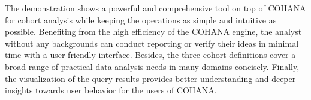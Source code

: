 \documentclass[10pt,conference,letterpaper]{IEEEtran}
\begin{document}
The demonstration shows a powerful and comprehensive tool on top of COHANA for cohort analysis while keeping the operations as simple and intuitive as possible. Benefiting from the high efficiency of the COHANA engine, the analyst without any backgrounds can conduct reporting or verify their ideas in minimal time with a user-friendly interface. Besides, the three cohort definitions cover a broad range of practical data analysis needs in many domains concisely. Finally, the visualization of the query results provides better understanding and deeper insights towards user behavior for the users of COHANA.







\end{document}

